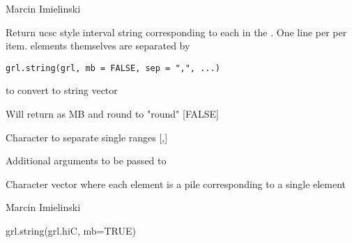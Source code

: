\documentclass[a4paper]{book}
\begin{document}
%
\begin{Author}\relax
Marcin Imielinski
\end{Author}
%
\begin{Examples}
\end{Examples}
%
\begin{Description}\relax
Return ucsc style interval string corresponding to each  in the .
One line per per  item.  elements themselves are separated by 
\end{Description}
%
\begin{Usage}
\begin{verbatim}
grl.string(grl, mb = FALSE, sep = ",", ...)
\end{verbatim}
\end{Usage}
%
\begin{Arguments}
\begin{ldescription}
\item[\code{grl}]  to convert to string vector

\item[\code{mb}] Will return as MB and round to "round" [FALSE]

\item[\code{sep}] Character to separate single  ranges [,]

\item[\code{...}] Additional arguments to be passed to 
\end{ldescription}
\end{Arguments}
%
\begin{Value}
Character vector where each element is a  pile corresponding to a single  element
\end{Value}
%
\begin{Author}\relax
Marcin Imielinski
\end{Author}
%
\begin{Examples}
\begin{ExampleCode}
grl.string(grl.hiC, mb=TRUE)
\end{ExampleCode}
\end{Examples}
\end{document}
